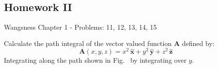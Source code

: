         \subsection{Homework II}
            Wangsness Chapter 1 - Problems: 11, 12, 13, 14, 15
            \begin{problem}[Wangsness 1-11]
                \label{problem:EMAG_1_Wangsness_1_11}
                Calculate the path integral of the vector
                valued function $\mathbf{A}$ defined by:
                \begin{equation}
                    \mathbf{A}(x,y,z)=
                         x^{2}\,\hat{\mathbf{x}}
                        +y^{2}\,\hat{\mathbf{y}}
                        +z^{2}\,\hat{\mathbf{z}}
                \end{equation}
                Integrating along the path shown in
                Fig.~
                by integrating over $y$.
            \end{problem}
